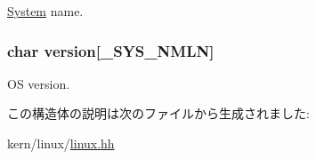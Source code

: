 \hyperlink{classSystem}{System} name. \hypertarget{structLinux_1_1utsname_a1e88526d3e96aa25d88df1541dafe922}{
\subsubsection[{version}]{\setlength{\rightskip}{0pt plus 5cm}char {\bf version}\mbox{[}{\bf \_\-SYS\_\-NMLN}\mbox{]}}}
\label{structLinux_1_1utsname_a1e88526d3e96aa25d88df1541dafe922}


OS version. 

この構造体の説明は次のファイルから生成されました:\begin{DoxyCompactItemize}
\item 
kern/linux/\hyperlink{kern_2linux_2linux_8hh}{linux.hh}\end{DoxyCompactItemize}
